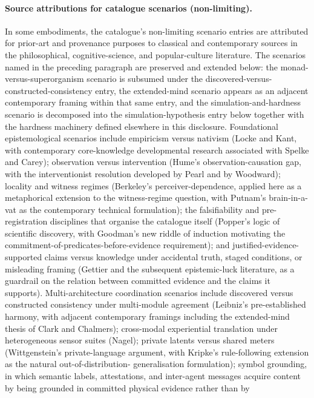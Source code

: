 \documentclass[a4paper,12pt]{article}
\begin{document}
\paragraph{Source attributions for catalogue scenarios (non-limiting).}
In some embodiments, the catalogue's non-limiting scenario entries
are attributed for prior-art and provenance purposes to classical
and contemporary sources in the philosophical, cognitive-science,
and popular-culture literature. The scenarios named in the
preceding paragraph are preserved and extended below: the
monad-versus-superorganism scenario is subsumed under the
discovered-versus-constructed-consistency entry, the extended-mind
scenario appears as an adjacent contemporary framing within that
same entry, and the simulation-and-hardness scenario is decomposed
into the simulation-hypothesis entry below together with the
hardness machinery defined elsewhere in this disclosure.
Foundational epistemological scenarios include empiricism versus
nativism (Locke and Kant, with contemporary core-knowledge
developmental research associated with Spelke and Carey);
observation versus intervention (Hume's observation-causation gap,
with the interventionist resolution developed by Pearl and by
Woodward); locality and witness regimes (Berkeley's
perceiver-dependence, applied here as a metaphorical extension to
the witness-regime question, with Putnam's brain-in-a-vat as the
contemporary technical formulation); the falsifiability and
pre-registration disciplines that organise the catalogue itself
(Popper's logic of scientific discovery, with Goodman's new riddle
of induction motivating the commitment-of-predicates-before-evidence
requirement); and justified-evidence-supported claims versus
knowledge under accidental truth, staged conditions, or misleading
framing (Gettier and the subsequent epistemic-luck literature, as
a guardrail on the relation between committed evidence and the
claims it supports). Multi-architecture coordination scenarios
include discovered versus constructed consistency under
multi-module agreement (Leibniz's pre-established harmony, with
adjacent contemporary framings including the extended-mind thesis
of Clark and Chalmers); cross-modal experiential translation under
heterogeneous sensor suites (Nagel); private latents versus shared
meters (Wittgenstein's private-language argument, with Kripke's
rule-following extension as the natural out-of-distribution-
generalisation formulation); symbol grounding, in which semantic
labels, attestations, and inter-agent messages acquire content by
being grounded in committed physical evidence rather than by
\end{document}
